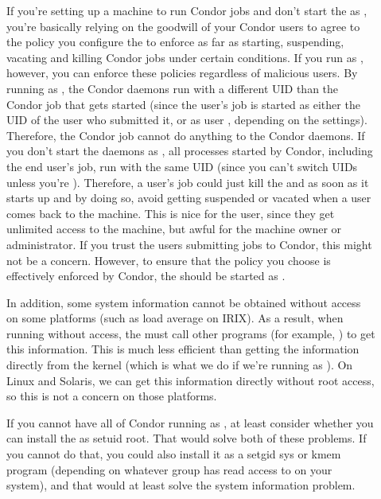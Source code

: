 \begin{description}

\item[] If you're setting up a machine to run Condor
   jobs and don't start the  as , you're basically
   relying on the goodwill of your Condor users to agree to the policy
   you configure the  to enforce as far as starting, suspending,
   vacating and killing Condor jobs under certain conditions.  If you
   run as , however, you can enforce these policies regardless of
   malicious users.  By running as , the Condor daemons run with a
   different UID than the Condor job that gets started (since the
   user's job is started as either the UID of the user who submitted
   it, or as user , depending on the 
   settings).  Therefore, the Condor job cannot do anything to the
   Condor daemons.  If you don't start the daemons as , all
   processes started by Condor, including the end user's job, run with
   the same UID (since you can't switch UIDs unless you're ).
   Therefore, a user's job could just kill the  and
    as soon as it starts up and by doing so, avoid
   getting suspended or vacated when a user comes back to the machine.
   This is nice for the user, since they get unlimited access to the
   machine, but awful for the machine owner or administrator.  If you
   trust the users submitting jobs to Condor, this might not be a
   concern.  However, to ensure that the policy you choose is
   effectively enforced by Condor, the  should be
   started as .

   In addition, some system information cannot be obtained without
    access on some platforms (such as load average on IRIX).  As a
   result, when running without  access, the  must
   call other programs (for example, ) to get this
   information.  This is much less efficient than getting the
   information directly from the kernel (which is what we do if we're
   running as ).  On Linux and Solaris, we can get this
   information directly without root access, so this is not a concern
   on those platforms.

   If you cannot have all of Condor running as , at least consider
   whether you can install the  as setuid root.  That
   would solve both of these problems.  If you cannot do that, you
   could also install it as a setgid sys or kmem program (depending on
   whatever group has read access to  on your system),
   and that would at least solve the system information problem.


\end{description}
